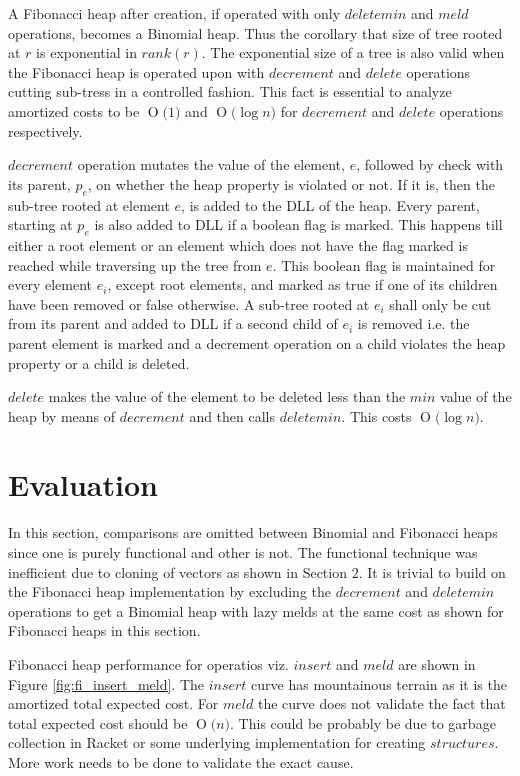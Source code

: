 \documentclass{llncs}
\newcommand{\BigO}[1]{\ensuremath{\operatorname{O}\bigl(#1\bigr)}}
\begin{document}
A Fibonacci heap after creation, if operated with only $deletemin$ and $meld$ operations, becomes a Binomial heap. Thus the corollary that size of tree rooted at $r$ is exponential in $rank(r)$. The exponential size of a tree is also valid when the Fibonacci heap is operated upon with $decrement$ and $delete$ operations cutting sub-tress in a controlled fashion\cite{kozen1992design}. This fact is essential to analyze amortized costs to be \BigO{1} and \BigO{\log n} for $decrement$ and $delete$ operations respectively. 

$decrement$ operation mutates the value of the element, $e$, followed by check with its parent, $p_e$, on whether the heap property is violated or not. If it is, then the sub-tree rooted at element $e$, is added to the DLL of the heap. Every parent, starting at $p_e$ is also added to DLL if a boolean flag is marked. This happens till either a root element or an element which does not have the flag marked is reached while traversing up the tree from $e$. This boolean flag is maintained for every element $e_i$, except root elements, and marked as true if one of its children have been removed or false otherwise. A sub-tree rooted at $e_i$ shall only be cut from its parent and added to DLL if a second child of $e_i$ is removed i.e. the parent element is marked and a decrement operation on a child violates the heap property or a child is deleted.

$delete$ makes the value of the element to be deleted less than the $min$ value of the heap by means of $decrement$ and then calls $deletemin$. This costs \BigO{\log n}.


\section{Evaluation}
In this section, comparisons are omitted between Binomial and Fibonacci heaps since one is purely functional and other is not. The functional technique was inefficient due to cloning of vectors as shown in Section $2$. It is trivial to build on the Fibonacci heap implementation by excluding the $decrement$ and $deletemin$ operations to get a Binomial heap with lazy melds\cite{kozen1992design} at the same cost as shown for Fibonacci heaps in this section. 

Fibonacci heap performance for operatios viz. $insert$ and $meld$ are shown in Figure \ref{fig:fi_insert_meld}. The $insert$ curve has mountainous terrain as it is the amortized total expected cost. For $meld$ the curve does not validate the fact that total expected cost should be \BigO{n}. This could be probably be due to garbage collection in Racket or some underlying implementation for creating $structures$. More work needs to be done to validate the exact cause.
\end{document}
